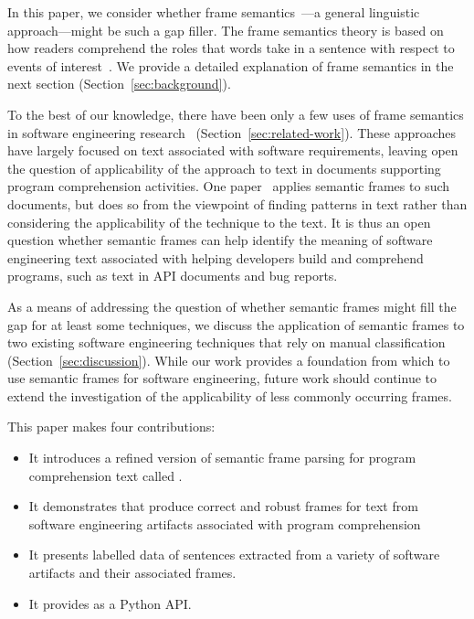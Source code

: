In this paper, we consider whether frame
semantics~\cite{fillmore1976frame, Baker1998}---a general
linguistic approach---might be such a gap filler.  The frame semantics
theory is based on how readers comprehend the roles that words take in
a sentence with respect to events of interest~\cite{Baker1998,
  jurafskyspeech}. We provide a detailed
  explanation of frame semantics in the next
  section (Section~\ref{sec:background}).



To the best of our knowledge, there have been only a few uses of frame
semantics in software engineering research~\cite{jha2017, kundi2017, alhoshan2019using, Marques2020} (Section~\ref{sec:related-work}). These approaches
have largely focused on text associated
with software requirements, leaving open the
question of applicability of the approach to
text in documents supporting program
comprehension activities.
One paper~\cite{Marques2020} applies semantic
frames to such documents, but does so from the
viewpoint of finding patterns in text rather than
considering the applicability of the technique
to the text.
It is thus an open question whether semantic
frames can help identify the meaning of
software engineering text associated with helping
developers build and comprehend programs, such as
text in API documents and bug reports.



As a means of addressing the question of whether semantic frames might fill the gap for at least some techniques,
we discuss the application of semantic frames
to two existing software engineering techniques that rely on manual classification
(Section~\ref{sec:discussion}).
While our work provides a
foundation from which to use semantic frames for software engineering, future
work should continue to extend the investigation of the applicability of less
commonly occurring frames.

This paper makes four contributions:
\begin{itemize}
\item It introduces a refined version of semantic frame parsing for program comprehension text called \api{}.
\item It demonstrates that \api{} produce correct and robust frames for text from software engineering artifacts associated with program comprehension
\item It presents labelled data of sentences extracted from a variety of software artifacts and their associated frames.
\item It provides \api{} as a Python API.
\end{itemize}

